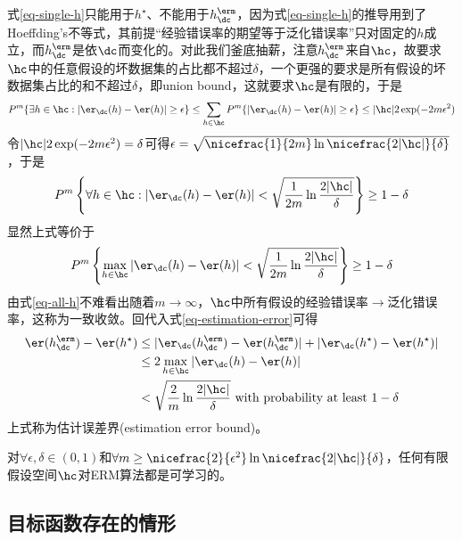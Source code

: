 \documentclass{ctexart}
\begin{document}
式\eqref{eq-single-h}只能用于$h^\star$、不能用于$h_\dc^\erm$，因为式\eqref{eq-single-h}的推导用到了Hoeffding's不等式，其前提“经验错误率的期望等于泛化错误率”只对固定的$h$成立，而$h_\dc^\erm$是依$\dc$而变化的。对此我们釜底抽薪，注意$h_\dc^\erm$来自$\hc$，故要求$\hc$中的任意假设的坏数据集的占比都不超过$\delta$，一个更强的要求是所有假设的坏数据集占比的和不超过$\delta$，即union bound，这就要求$\hc$是有限的，于是
\begin{align} \label{eq-finite-H}
    P^m \{\exists h \in \hc: |\er_\dc (h) - \er (h)| \ge \epsilon\}
    \le \sum_{h \in \hc} P^m \{ |\er_\dc (h) - \er (h)| \ge \epsilon \} \le |\hc| 2 \exp(-2 m \epsilon^2)
\end{align}
令$|\hc| 2 \exp(-2 m \epsilon^2) = \delta$可得$\epsilon = \sqrt{\nicefrac{1}{2m} \ln \nicefrac{2|\hc|}{\delta}}$，于是
\begin{align*}
    P^m \left\{ \forall h \in \hc: |\er_\dc (h) - \er (h)| < \sqrt{\frac{1}{2m} \ln \frac{2|\hc|}{\delta}} \right\} \ge 1 - \delta
\end{align*}
显然上式等价于
\begin{align} \label{eq-all-h}
    P^m \left\{ \max_{h \in \hc} |\er_\dc (h) - \er (h)| < \sqrt{\frac{1}{2m} \ln \frac{2|\hc|}{\delta}} \right\} \ge 1 - \delta
\end{align}
由式\eqref{eq-all-h}不难看出随着$m \rightarrow \infty$，$\hc$中所有假设的经验错误率$\rightarrow$泛化错误率，这称为一致收敛。回代入式\eqref{eq-estimation-error}可得
\begin{align*}
    \er(h_\dc^\erm) - \er(h^\star) & \le |\er_\dc (h_\dc^\erm) - \er(h_\dc^\erm)| + |\er_{\dc} (h^\star) - \er(h^\star)|    \\
                                     & \le 2 \max_{h \in \hc} |\er_\dc (h) - \er (h)|                                             \\
                                     & < \sqrt{\frac{2}{m} \ln \frac{2|\hc|}{\delta}} \text{ with probability at least } 1 - \delta
\end{align*}
上式称为估计误差界(estimation error bound)。

\begin{theorem}
    对$\forall \epsilon, \delta \in (0,1)$和$\forall m \ge \nicefrac{2}{\epsilon^2} \ln \nicefrac{2|\hc|}{\delta}$，任何有限假设空间$\hc$对ERM算法都是可学习的。
\end{theorem}

\subsection{目标函数存在的情形}
\end{document}
